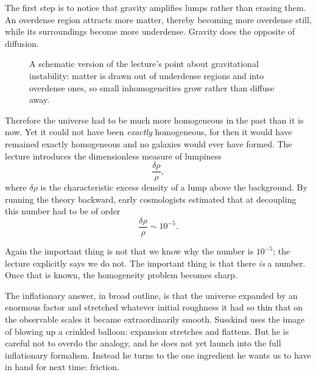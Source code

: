 The first step is to notice that gravity amplifies lumps rather than erasing them. An overdense region attracts more matter, thereby becoming more overdense still, while its surroundings become more underdense. Gravity does the opposite of diffusion.

\begin{figure}
\centering
{}
\caption{A schematic version of the lecture's point about gravitational instability: matter is drawn out of underdense regions and into overdense ones, so small inhomogeneities grow rather than diffuse away.}
\end{figure}

Therefore the universe had to be much more homogeneous in the past than it is now. Yet it could not have been \emph{exactly} homogeneous, for then it would have remained exactly homogeneous and no galaxies would ever have formed. The lecture introduces the dimensionless measure of lumpiness
\begin{equation}
\frac{\delta \rho}{\rho},
\end{equation}
where \(\delta\rho\) is the characteristic excess density of a lump above the background. By running the theory backward, early cosmologists estimated that at decoupling this number had to be of order
\begin{equation}
\frac{\delta \rho}{\rho}\sim 10^{-5}.
\end{equation}

Again the important thing is not that we know why the number is \(10^{-5}\); the lecture explicitly says we do not. The important thing is that there \emph{is} a number. Once that is known, the homogeneity problem becomes sharp.

The inflationary answer, in broad outline, is that the universe expanded by an enormous factor and stretched whatever initial roughness it had so thin that on the observable scales it became extraordinarily smooth. Susskind uses the image of blowing up a crinkled balloon: expansion stretches and flattens. But he is careful not to overdo the analogy, and he does not yet launch into the full inflationary formalism. Instead he turns to the one ingredient he wants us to have in hand for next time: friction.

